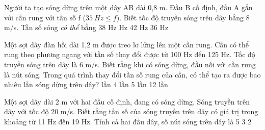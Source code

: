 \begin{vidu}%
Người ta tạo sóng dừng trên một dây AB dài 0,8 m. Đầu B cố định, đầu A gắn với cần rung với tần số f  ($35 \ Hz \leq f$). Biết tốc độ truyền sóng trên dây bằng 8 m/s. Tần số sóng \textit{có thể} bằng
\choice
{38 Hz}
{ Hz}
{42 Hz}
{36 Hz}
\end{vidu} %
\begin{vidu}%
Một sợi dây đàn hồi dài 1,2 m được treo lơ lửng lên một cần rung. Cần có thể rung theo phương ngang với tần số thay đổi được từ 100 Hz đến 125 Hz. Tốc độ truyền sóng trên dây là 6 m/s. Biết rằng khi có sóng dừng, đầu nối với cần rung là nút sóng. Trong quá trình thay đổi tần số rung của cần, có thể tạo ra được bao nhiêu lần sóng dừng trên dây? 
\choice
{ lần}
{4 lần}
{5 lần}
{12 lần}
\end{vidu} %
\begin{vidu}%
 Một sợi dây dài 2 m với hai đầu cố định, đang có sóng dừng. Sóng truyền trên dây với tốc độ 20 m/s. Biết rằng tần số của sóng truyền trên dây có giá trị trong khoảng từ 11 Hz đến 19 Hz. Tính cả hai đầu dây, số nút sóng trên dây là
\choice
{5}
{3}
{}
{2}
\end{vidu} %
